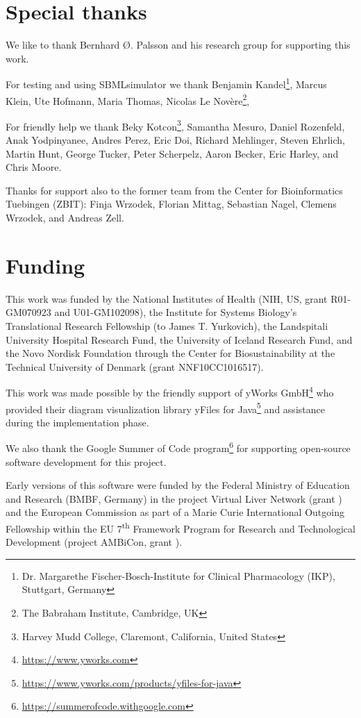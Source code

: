 \section{Special thanks}

We like to thank Bernhard \O. Palsson and his research group for supporting this work.

For testing and using SBMLsimulator we thank
Benjamin Kandel\footnote{Dr. Margarethe Fischer-Bosch-Institute for Clinical Pharmacology (IKP), Stuttgart, Germany\label{fn:ikp}},
Marcus Klein,
Ute Hofmann,
Maria Thomas,
Nicolas Le Nov\`{e}re\footnote{The Babraham Institute, Cambridge, UK\label{fn:babraham}},

For friendly help we thank Beky Kotcon\footnote{Harvey Mudd College, Claremont, California, United States\label{fn:harvey}}, Samantha Mesuro, Daniel Rozenfeld, Anak Yodpinyanee, Andres Perez, Eric Doi, Richard Mehlinger, Steven Ehrlich, Martin Hunt, George Tucker, Peter Scherpelz, Aaron Becker, Eric Harley, and Chris Moore.

Thanks for support also to the former team from the Center for Bioinformatics Tuebingen (ZBIT): Finja Wrzodek, Florian Mittag, Sebastian Nagel, Clemens Wrzodek, and Andreas Zell.

\section{Funding}

This work was funded by the National Institutes of Health (NIH, US, grant \numero R01-GM070923 and U01-GM102098), the Institute for Systems Biology's Translational Research Fellowship (to James T. Yurkovich), the Landspitali University Hospital Research Fund, the University of Iceland Research Fund, and the Novo Nordisk Foundation through the Center for Biosustainability at the Technical University of Denmark (grant \numero NNF10CC1016517).

This work was made possible by the friendly support of yWorks GmbH\footnote{\url{https://www.yworks.com}} who provided their diagram visualization library yFiles for Java\texttrademark\footnote{\url{https://www.yworks.com/products/yfiles-for-java}} and assistance during the implementation phase.

We also thank the Google Summer of Code program\footnote{\url{https://summerofcode.withgoogle.com}} for supporting open-source software development for this project.

Early versions of this software were funded by the Federal Ministry of Education and Research (BMBF, Germany) in the project Virtual Liver Network (grant ) and the European Commission as part of a Marie Curie International Outgoing Fellowship within the EU 7\textsuperscript{th} Framework Program for Research and Technological Development (project AMBiCon, grant ).
